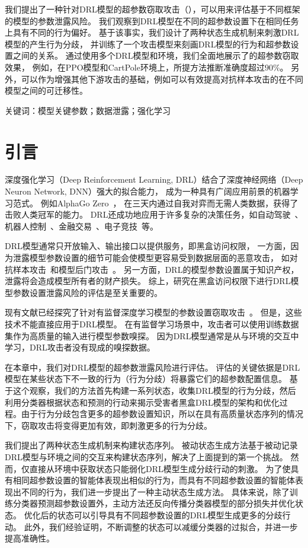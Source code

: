 我们提出了一种针对DRL模型的超参数窃取攻击（\sysname），可以用来评估基于不同框架的模型的参数泄露风险。
我们观察到DRL模型在不同的超参数设置下在相同任务上具有不同的行为偏好。
基于该事实，我们设计了两种状态生成机制来刺激DRL模型的产生行为分歧，
并训练了一个攻击模型来刻画DRL模型的行为和超参数设置之间的关系。
通过使用多个DRL模型和环境，我们全面地展示了\sysname 的超参数窃取效果，
例如，在PPO模型和CartPole环境上，所提方法推断准确度超过$90\%$。
另外，\sysname 可以作为增强其他下游攻击的基础，例如\sysname 可以有效提高对抗样本攻击的在不同模型之间的可迁移性。

关键词：模型关键参数；数据泄露；强化学习

\section{引言}

深度强化学习（Deep Reinforcement Learning, DRL）结合了深度神经网络（Deep Neuron Network, DNN）强大的拟合能力，
成为一种具有广阔应用前景的机器学习范式。
例如AlphaGo Zero~\cite{SSSAHGHBLB17}，
在三天内通过自我对弈而无需人类数据，获得了击败人类冠军的能力。
DRL还成功地应用于许多复杂的决策任务，如自动驾驶~\cite{FHOL18}、机器人控制~\cite{A17}、金融交易~\cite{DBKRD17}、电子竞技~\cite{SSSAHGHBLB17,BBCCDDFFHHJGOPPPRSSSSSTWZ19}等。

DRL模型通常只开放输入、输出接口以提供服务，即黑盒访问权限，
一方面，因为泄露模型参数设置的细节可能会使模型更容易受到数据层面的恶意攻击，
如对抗样本攻击~\cite{HPGDA17, BM17, LHLSLS17, KS17}和模型后门攻击~\cite{KWSL20,YIRV19,KWJL20,WSLMJ21,WJWGXS21}。
另一方面，DRL的模型参数设置属于知识产权，泄露将会造成模型所有者的财产损失。
综上，研究在黑盒访问权限下进行DRL模型参数设置泄露风险的评估是至关重要的。

现有文献已经探究了针对有监督深度学习模型的参数设置窃取攻击~\cite{OASF18,WG18}。
但是，这些技术不能直接应用于DRL模型。
在有监督学习场景中，攻击者可以使用训练数据集作为高质量的输入进行模型参数嗅探。
因为DRL模型通常是从与环境的交互中学习，DRL攻击者没有现成的嗅探数据。


在本章中，我们对DRL模型的超参数泄露风险进行评估。
评估的关键依据是DRL模型在某些状态下不一致的行为（行为分歧）将暴露它们的超参数配置信息。
基于这个观察，我们的方法首先构建一系列状态，收集DRL模型的行为分歧，然后利用分类器根据状态和预测的行动来揭示受害者黑盒DRL模型的架构和优化过程。由于行为分歧包含更多的超参数设置知识，所以在具有高质量状态序列的情况下，窃取攻击将变得更加有效，即刺激更多的行为分歧。

我们提出了两种状态生成机制来构建状态序列。 
被动状态生成方法基于被动记录DRL模型与环境之间的交互来构建状态序列，解决了上面提到的第一个挑战。
然而，仅直接从环境中获取状态只能弱化DRL模型生成分歧行动的刺激。
为了使具有相同超参数设置的智能体表现出相似的行为，而具有不同超参数设置的智能体表现出不同的行为，我们进一步提出了一种主动状态生成方法。
具体来说，除了训练分类器预测超参数设置外，主动方法还反向传播分类器模型的部分损失并优化状态。
优化后的状态可以引导具有不同超参数设置的DRL模型生成更多的分歧行动。
此外，我们经验证明，不断调整的状态可以减缓分类器的过拟合，并进一步提高准确性。

